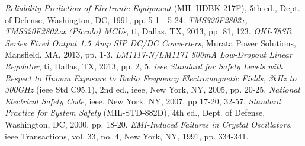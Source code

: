 \begin{thebibliography}{9}
	\textit{Reliability Prediction of Electronic Equipment} (MIL-HDBK-217F), 5th ed.,
	Dept. of Defense, Washington, DC,
	1991, pp. 5-1 - 5-24.
	\textit{TMS320F2802x, TMS320F2802xx (Piccolo) MCUs},
	\gls{ti}, Dallas, TX,
	2013, pp. 81, 123.
	\textit{OKI-78SR Series Fixed Output 1.5 Amp SIP DC/DC Converters},
	Murata Power Solutions, Mansfield, MA,
	2013, pp. 1-3.
	\textit{LM1117-N/LM1171 800mA Low-Dropout Linear Regulator},
	\gls{ti}, Dallas, TX,
	2013, pp. 2, 5.
	\textit{\gls{ieee} Standard for Safety Levels with Respect to Human Exposure to Radio Frequency Electromagnetic Fields, 3kHz to 300GHz} (\gls{ieee} Std C95.1), 2nd ed.,
	\gls{ieee}, New York, NY,
	2005, pp. 20-25.
	\textit{National Electrical Safety Code},
	\gls{ieee}, New York, NY,
	2007, pp 17-20, 32-57.
	\textit{Standard Practice for System Safety} (MIL-STD-882D), 4th ed.,
	Dept. of Defense, Washington, DC,
	2000, pp. 18-20.
	\textit{EMI-Induced Failures in Crystal Oscillators},
	\gls{ieee} Transactions, vol. 33, no. 4, New York, NY,
	1991, pp. 334-341.
\end{thebibliography}